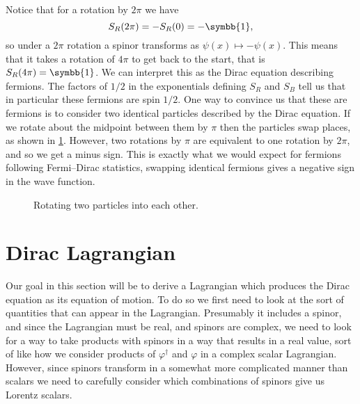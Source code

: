 \documentclass[fleqn]{NotesClass}
\newcommand{\hermit}{{\dagger}}
\newcommand{\ident}{\symbb{1}}
\begin{document}
    Notice that for a rotation by \(2\pi\) we have
    \begin{equation}
        S_R(2\pi) = -S_R(0) = -\ident,
    \end{equation}
    so under a \(2\pi\) rotation a spinor transforms as \(\psi(x) \mapsto -\psi(x)\).
    This means that it takes a rotation of \(4\pi\) to get back to the start, that is \(S_R(4\pi) = \ident\).
    We can interpret this as the Dirac equation describing fermions.
    The factors of \(1/2\) in the exponentials defining \(S_R\) and \(S_B\) tell us that in particular these fermions are spin \(1/2\).
    One way to convince us that these are fermions is to consider two identical particles described by the Dirac equation.
    If we rotate about the midpoint between them by \(\pi\) then the particles swap places, as shown in \cref{fig:rotating fermions into each other}.
    However, two rotations by \(\pi\) are equivalent to one rotation by \(2\pi\), and so we get a minus sign.
    This is exactly what we would expect for fermions following Fermi--Dirac statistics, swapping identical fermions gives a negative sign in the wave function.
    
    \begin{figure}
        \caption{Rotating two particles into each other.}
        \label{fig:rotating fermions into each other}
    \end{figure}
    
    \chapter{Dirac Lagrangian}
    Our goal in this section will be to derive a Lagrangian which produces the Dirac equation as its equation of motion.
    To do so we first need to look at the sort of quantities that can appear in the Lagrangian.
    Presumably it includes a spinor, and since the Lagrangian must be real, and spinors are complex, we need to look for a way to take products with spinors in a way that results in a real value, sort of like how we consider products of \(\varphi^\hermit\) and \(\varphi\) in a complex scalar Lagrangian.
    However, since spinors transform in a somewhat more complicated manner than scalars we need to carefully consider which combinations of spinors give us Lorentz scalars.
    
\end{document}
